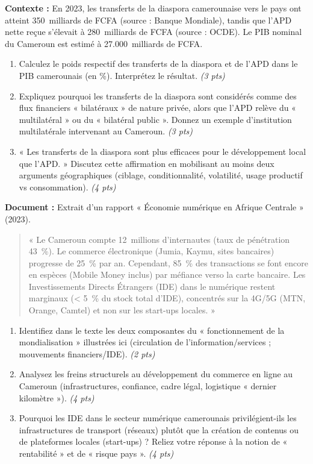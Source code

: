 \documentclass[11pt]{article}
\begin{document}
\begin{exercice}
\textbf{Contexte :} En 2023, les transferts de la diaspora camerounaise vers le pays ont atteint \SI{350}{milliards} de FCFA (source : Banque Mondiale), tandis que l'APD nette reçue s'élevait à \SI{280}{milliards} de FCFA (source : OCDE). Le PIB nominal du Cameroun est estimé à \SI{27.000}{milliards} de FCFA.

\begin{enumerate}
\item Calculez le poids respectif des transferts de la diaspora et de l'APD dans le PIB camerounais (en \%). Interprétez le résultat. \textit{(3 pts)}
\item Expliquez pourquoi les transferts de la diaspora sont considérés comme des flux financiers « bilatéraux » de nature privée, alors que l'APD relève du « multilatéral » ou du « bilatéral public ». Donnez un exemple d'institution multilatérale intervenant au Cameroun. \textit{(3 pts)}
\item « Les transferts de la diaspora sont plus efficaces pour le développement local que l'APD. » Discutez cette affirmation en mobilisant au moins deux arguments géographiques (ciblage, conditionnalité, volatilité, usage productif vs consommation). \textit{(4 pts)}
\end{enumerate}
\end{exercice}

\begin{exercice}
\textbf{Document :} Extrait d'un rapport « Économie numérique en Afrique Centrale » (2023).
\begin{quote}
« Le Cameroun compte \SI{12}{millions} d'internautes (taux de pénétration \SI{43}{\%}). Le commerce électronique (Jumia, Kaymu, sites bancaires) progresse de \SI{25}{\%} par an. Cependant, \SI{85}{\%} des transactions se font encore en espèces (Mobile Money inclus) par méfiance verso la carte bancaire. Les Investissements Directs Étrangers (IDE) dans le numérique restent marginaux (\SI{< 5}{\%} du stock total d'IDE), concentrés sur la 4G/5G (MTN, Orange, Camtel) et non sur les start-ups locales. »
\end{quote}

\begin{enumerate}
\item Identifiez dans le texte les deux composantes du « fonctionnement de la mondialisation » illustrées ici (circulation de l'information/services ; mouvements financiers/IDE). \textit{(2 pts)}
\item Analysez les freins structurels au développement du commerce en ligne au Cameroun (infrastructures, confiance, cadre légal, logistique « dernier kilomètre »). \textit{(4 pts)}
\item Pourquoi les IDE dans le secteur numérique camerounais privilégient-ils les infrastructures de transport (réseaux) plutôt que la création de contenus ou de plateformes locales (start-ups) ? Reliez votre réponse à la notion de « rentabilité » et de « risque pays ». \textit{(4 pts)}
\end{enumerate}
\end{exercice}
\end{document}
